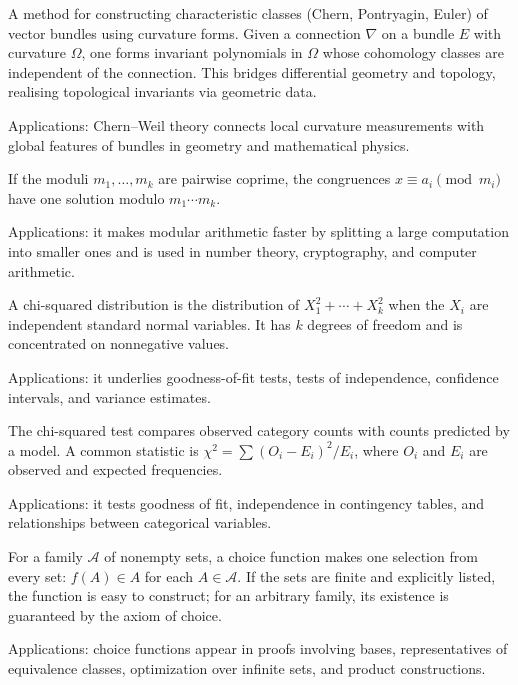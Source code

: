 A method for constructing characteristic classes (Chern, Pontryagin, Euler) of vector bundles using curvature forms. Given a connection $\nabla$ on a bundle $E$ with curvature $\Omega$, one forms invariant polynomials in $\Omega$ whose cohomology classes are independent of the connection. This bridges differential geometry and topology, realising topological invariants via geometric data. \par\noindent Applications: Chern--Weil theory connects local curvature measurements with global features of bundles in geometry and mathematical physics.

If the moduli $m_1,\ldots,m_k$ are pairwise coprime, the congruences $x\equiv a_i\pmod{m_i}$ have one solution modulo $m_1\cdots m_k$. \par\noindent Applications: it makes modular arithmetic faster by splitting a large computation into smaller ones and is used in number theory, cryptography, and computer arithmetic.

A chi-squared distribution is the distribution of $X_1^2+\cdots+X_k^2$ when the $X_i$ are independent standard normal variables. It has $k$ degrees of freedom and is concentrated on nonnegative values. \par\noindent Applications: it underlies goodness-of-fit tests, tests of independence, confidence intervals, and variance estimates.

The chi-squared test compares observed category counts with counts predicted by a model. A common statistic is $\chi^2=\sum (O_i-E_i)^2/E_i$, where $O_i$ and $E_i$ are observed and expected frequencies. \par\noindent Applications: it tests goodness of fit, independence in contingency tables, and relationships between categorical variables.

For a family $\mathcal A$ of nonempty sets, a choice function makes one selection from every set: $f(A)\in A$ for each $A\in\mathcal A$. If the sets are finite and explicitly listed, the function is easy to construct; for an arbitrary family, its existence is guaranteed by the axiom of choice. \par\noindent Applications: choice functions appear in proofs involving bases, representatives of equivalence classes, optimization over infinite sets, and product constructions.

